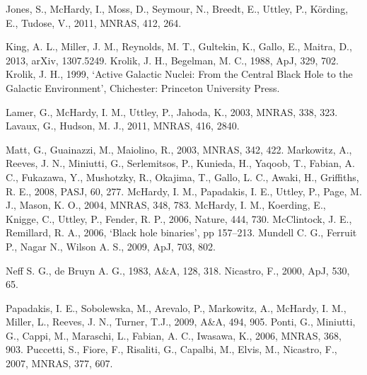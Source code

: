 \documentclass[letters,useAMS,usenatbib]{samnote}
\begin{document}
\begin{thebibliography}{99}
     Jones, S.,  McHardy, I., Moss, D., Seymour, N., Breedt, E., Uttley, P., K\"{o}rding, E., Tudose, V.,
2011, MNRAS, 412, 264.

     King, A. L., Miller, J. M., Reynolds, M. T., Gultekin, K., Gallo, E., Maitra, D., 2013, arXiv, 1307.5249.
     Krolik, J. H., Begelman, M. C., 1988, ApJ, 329, 702.
     Krolik, J. H., 1999, `Active Galactic Nuclei: From the Central Black Hole to the Galactic Environment',
Chichester: Princeton University Press.
    
     Lamer, G., McHardy, I. M., Uttley, P., Jahoda, K., 2003, MNRAS, 338, 323.
     Lavaux, G., Hudson, M. J., 2011, MNRAS, 416, 2840.
    
     Matt, G., Guainazzi, M., Maiolino, R., 2003, MNRAS, 342, 422.
     Markowitz, A., Reeves, J. N., Miniutti, G., Serlemitsos, P., Kunieda, H., Yaqoob, T., Fabian, A.
    C., Fukazawa, Y., Mushotzky, R., Okajima, T., Gallo, L. C., Awaki, H., Griffiths, R. E., 2008, PASJ, 60, 277.
     McHardy, I. M., Papadakis, I. E., Uttley, P., Page, M. J., Mason, K. O., 2004, MNRAS, 348, 783.
     McHardy, I. M., Koerding, E., Knigge, C., Uttley, P., Fender, R. P., 2006, Nature, 444, 730.
     McClintock, J. E., Remillard, R. A., 2006, `Black hole binaries', pp 157–213.
     Mundell C. G., Ferruit P., Nagar N., Wilson A. S., 2009, ApJ, 703, 802.
    
     Neff S. G., de Bruyn A. G., 1983, A\&A, 128, 318.
     Nicastro, F., 2000, ApJ, 530, 65.
    
     Papadakis, I. E., Sobolewska,  M., Arevalo,  P., Markowitz, A., McHardy, I. M., Miller,  L.,
    Reeves, J. N., Turner, T.J., 2009, A\&A, 494, 905.
     Ponti, G., Miniutti, G., Cappi, M., Maraschi, L., Fabian, A. C., Iwasawa, K., 2006, MNRAS, 368, 903.
     Puccetti, S., Fiore, F., Risaliti, G., Capalbi, M., Elvis, M., Nicastro, F., 2007, MNRAS, 377, 607.
    

\end{thebibliography}
\end{document}

